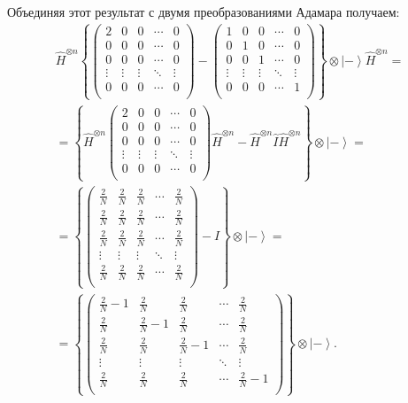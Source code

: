 Объединяя этот результат с двумя преобразованиями Адамара получаем:
\begin{eqnarray}
\hat{H}^{\otimes n}
\left\{
\begin{pmatrix}
2  & 0 & 0 & \cdots & 0 \\
0 & 0 & 0 & \cdots & 0 \\
0 & 0 & 0 & \cdots & 0 \\
\vdots & \vdots & \vdots & \ddots & \vdots \\
0 & 0 & 0  & \cdots & 0 \\
\end{pmatrix} - 
\begin{pmatrix}
1 & 0 & 0 & \cdots & 0 \\
0 & 1 & 0 & \cdots & 0 \\
0 & 0 & 1 & \cdots & 0 \\
\vdots & \vdots & \vdots & \ddots & \vdots \\
0 & 0 & 0  & \cdots & 1  \\
\end{pmatrix}
\right\}
\otimes \left|-\right>
\hat{H}^{\otimes n}
=
\nonumber \\
=
\left\{
\hat{H}^{\otimes n}
\begin{pmatrix}
2  & 0 & 0 & \cdots & 0 \\
0 & 0 & 0 & \cdots & 0 \\
0 & 0 & 0 & \cdots & 0 \\
\vdots & \vdots & \vdots & \ddots & \vdots \\
0 & 0 & 0  & \cdots & 0 \\
\end{pmatrix}
\hat{H}^{\otimes n}
- \hat{H}^{\otimes n} \hat{I} \hat{H}^{\otimes n}
\right\}
\otimes \left|-\right>
 = 
\nonumber \\
=
\left\{
\begin{pmatrix}
\frac{2}{N}  & \frac{2}{N} & \frac{2}{N} & \cdots & \frac{2}{N} \\
\frac{2}{N} & \frac{2}{N} & \frac{2}{N} & \cdots & \frac{2}{N} \\
\frac{2}{N} & \frac{2}{N} & \frac{2}{N} & \cdots & \frac{2}{N} \\
\vdots & \vdots & \vdots & \ddots & \vdots \\
\frac{2}{N} & \frac{2}{N} & \frac{2}{N} & \cdots & \frac{2}{N} \\
\end{pmatrix} - \hat{I}
\right\}
\otimes \left|-\right>
=
\nonumber \\
=
\left\{
\begin{pmatrix}
\frac{2}{N} - 1  & \frac{2}{N} & \frac{2}{N} & \cdots & \frac{2}{N} \\
\frac{2}{N} & \frac{2}{N} - 1 & \frac{2}{N} & \cdots & \frac{2}{N} \\
\frac{2}{N} & \frac{2}{N} & \frac{2}{N} - 1 & \cdots & \frac{2}{N} \\
\vdots & \vdots & \vdots & \ddots & \vdots \\
\frac{2}{N} & \frac{2}{N} & \frac{2}{N} & \cdots & \frac{2}{N} - 1\\
\end{pmatrix}
\right\}
\otimes \left|-\right>.
\label{eqQuantCompGroverMeanInvImpl}
\end{eqnarray}

